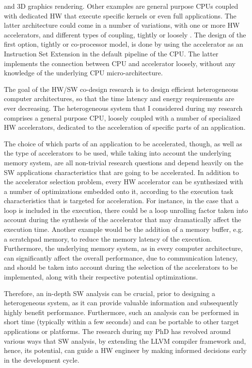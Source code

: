 \documentclass[]{usiinfthesis}
\begin{document}
and 3D graphics rendering. Other examples are general purpose CPUs coupled with dedicated HW
that execute specific kernels or even full applications. The latter architecture could come 
in a number of variations, with one or more HW accelerators, and different types of coupling, 
tightly or loosely \cite{CotaJun15}. The design of the first option, tightly or co-processor model, 
is done by using the accelerator as an Instruction Set Extension in the default pipeline of the CPU. 
The latter implements the connection between CPU and accelerator loosely, without any 
knowledge of the underlying CPU micro-architecture.\par
%
%
The goal of the HW/SW co-design research is to design efficient heterogeneous computer architectures, so that the
time latency and energy requirements are ever decreasing. The heterogeneous system
that I considered during my research comprises a general purpose CPU, loosely coupled with a number of 
specialized HW accelerators, dedicated to the acceleration of specific parts of an application.\par

The choice of which parts of an application to be accelerated, though, as well as the type 
of accelerators to be used, while taking into account the underlying memory system, are all
non-trivial research questions and depend heavily on the SW applications characteristics that
are going to be accelerated. In addition to the accelerator selection problem, 
every HW accelerator can be synthesized with a number of optimizations embedded onto it, according to 
the execution task characteristics that is targeted for acceleration. For instance, in the case that 
a loop is included in the execution, there could be a loop unrolling factor taken into account during 
the synthesis of the accelerator that may dramatically affect the execution time. Another example 
would be the addition of a memory buffer, e.g. a scratchpad memory, to reduce the memory latency
of the execution. Furthermore, the underlying memory system, as in every computer architecture, can
significantly affect the overall performance, due to communication latency, and should be taken into 
account during the selection of the accelerators to be implemented, along with their respective 
potential optimizations.\par

Therefore, an in-depth SW analysis can be crucial, prior to 
designing a heterogeneous system, as it can provide valuable information and subsequently 
highly benefit performance. Furthermore, such an analysis can be performed in short time (typically within a 
few seconds) and can be portable to other target applications or platforms. 
The research during my PhD has revolved around various ways that SW
analysis, by extending the LLVM compiler framework \cite{LattnerMar04} and, hence, its potential,
can guide a HW engineer %
by making informed decisions early in the development cycle.
\end{document}
